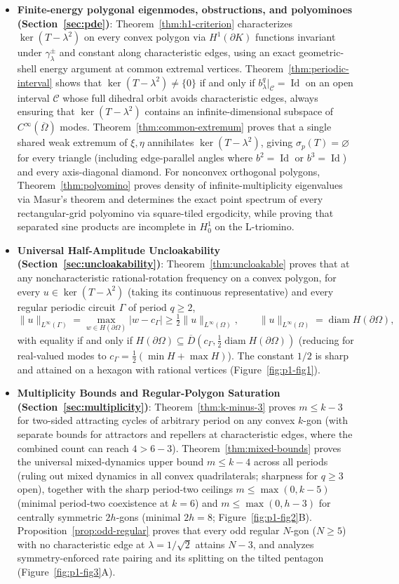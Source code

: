\documentclass[11pt,reqno]{amsart}
\theoremstyle{definition}
\theoremstyle{remark}
\DeclareMathOperator{\diam}{diam}
\DeclareMathOperator{\Id}{Id}
\begin{document}
\begin{itemize}
  \item \textbf{Finite-energy polygonal eigenmodes, obstructions, and polyominoes (Section~\ref{sec:pde})}: Theorem~\ref{thm:h1-criterion} characterizes $\ker(T - \lambda^2)$ on every convex polygon via $H^1(\partial K)$ functions invariant under $\gamma_\lambda^\pm$ and constant along characteristic edges, using an exact geometric-shell energy argument at common extremal vertices. Theorem~\ref{thm:periodic-interval} shows that $\ker(T-\lambda^2) \ne \{0\}$ if and only if $b_\lambda^q|_{\mathcal{C}} = \Id$ on an open interval $\mathcal{C}$ whose full dihedral orbit avoids characteristic edges, always ensuring that $\ker(T-\lambda^2)$ contains an infinite-dimensional subspace of $C^\infty(\overline{\Omega})$ modes. Theorem~\ref{thm:common-extremum} proves that a single shared weak extremum of $\xi,\eta$ annihilates $\ker(T-\lambda^2)$, giving $\sigma_p(T) = \varnothing$ for every triangle (including edge-parallel angles where $b^2 = \Id$ or $b^3 = \Id$) and every axis-diagonal diamond. For nonconvex orthogonal polygons, Theorem~\ref{thm:polyomino} proves density of infinite-multiplicity eigenvalues via Masur's theorem and determines the exact point spectrum of every rectangular-grid polyomino via square-tiled ergodicity, while proving that separated sine products are incomplete in $H_0^1$ on the L-triomino.
  \item \textbf{Universal Half-Amplitude Uncloakability (Section~\ref{sec:uncloakability})}: Theorem~\ref{thm:uncloakable} proves that at any noncharacteristic rational-rotation frequency on a convex polygon, for every $u \in \ker(T-\lambda^2)$ (taking its continuous representative) and every regular periodic circuit $\Gamma$ of period $q \ge 2$,
  \[
    \|u\|_{L^\infty(\Gamma)} = \max_{w \in H(\partial\Omega)} |w - c_\Gamma| \ge \tfrac{1}{2}\|u\|_{L^\infty(\Omega)}, \qquad \|u\|_{L^\infty(\Omega)} = \diam H(\partial\Omega),
  \]
  with equality if and only if $H(\partial\Omega) \subseteq \overline{D}(c_\Gamma, \frac{1}{2}\diam H(\partial\Omega))$ (reducing for real-valued modes to $c_\Gamma = \frac{1}{2}(\min H + \max H)$). The constant $1/2$ is sharp and attained on a hexagon with rational vertices (Figure~\ref{fig:p1-fig1}).
  \item \textbf{Multiplicity Bounds and Regular-Polygon Saturation (Section~\ref{sec:multiplicity})}: Theorem~\ref{thm:k-minus-3} proves $m \le k-3$ for two-sided attracting cycles of arbitrary period on any convex $k$-gon (with separate bounds for attractors and repellers at characteristic edges, where the combined count can reach $4 > 6-3$). Theorem~\ref{thm:mixed-bounds} proves the universal mixed-dynamics upper bound $m \le k-4$ across all periods (ruling out mixed dynamics in all convex quadrilaterals; sharpness for $q \ge 3$ open), together with the sharp period-two ceilings $m \le \max(0, k-5)$ (minimal period-two coexistence at $k=6$) and $m \le \max(0, h-3)$ for centrally symmetric $2h$-gons (minimal $2h=8$; Figure~\ref{fig:p1-fig2}B). Proposition~\ref{prop:odd-regular} proves that every odd regular $N$-gon ($N \ge 5$) with no characteristic edge at $\lambda = 1/\sqrt{2}$ attains $N-3$, and analyzes symmetry-enforced rate pairing and its splitting on the tilted pentagon (Figure~\ref{fig:p1-fig3}A).

\end{itemize}
\end{document}
